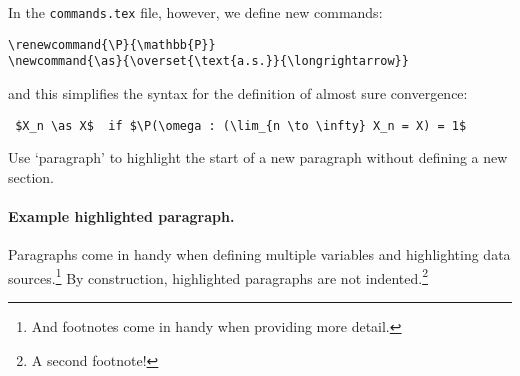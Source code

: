 In the \texttt{commands.tex} file, however, we define new commands:
\begin{verbatim}
\renewcommand{\P}{\mathbb{P}} 
\newcommand{\as}{\overset{\text{a.s.}}{\longrightarrow}}
\end{verbatim}
and this simplifies the syntax for the definition of almost sure convergence:

\begin{verbatim} $X_n \as X$  if $\P(\omega : (\lim_{n \to \infty} X_n = X) = 1$\end{verbatim}

Use `paragraph' to highlight the start of a new paragraph without defining a new section.

\paragraph{Example highlighted paragraph.}

Paragraphs come in handy when defining multiple variables and highlighting data sources.\footnote{And footnotes come in handy when providing more detail.} By construction, highlighted paragraphs are not indented.\footnote{A second footnote!}